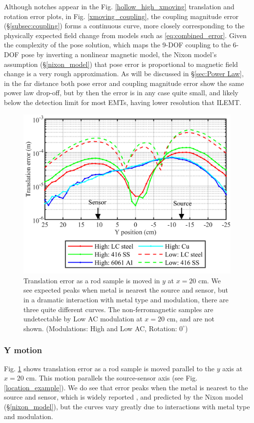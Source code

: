 \documentclass[journal,twoside,web]{ieeecolor}
\begin{document}
Although notches appear in the Fig. \ref{hollow_high_xmoving} translation and rotation error plots, in Fig. \ref{xmoving_coupling}, the coupling magnitude error (\S\ref{subsec:coupling}) forms a continuous curve, more closely corresponding to the physically expected field change from models such as \eqref{eq:combined_error}. Given the complexity of the pose solution, which maps the 9-DOF coupling to the 6-DOF pose by inverting a nonlinear magnetic model, the Nixon model's assumption (\S\ref{nixon_model}) that pose error is proportional to magnetic field change is a very rough approximation. As will be discussed in \S\ref{sec:Power Law}, in the far distance both pose error and coupling magnitude error show the same power law drop-off, but by then the error is in any case quite small, and likely below the detection limit for most EMTs, having lower resolution that ILEMT.


\begin{figure}[!tb]
\centerline{\includegraphics[width=\columnwidth]{chaic8.png}}
\caption{Translation error as a rod sample is moved in $y$ at $x = 20$ cm. We see expected peaks when metal is nearest the source and sensor, but in a dramatic interaction with metal type and modulation, there are three quite different curves. The non-ferromagnetic samples are undetectable by Low AC modulation at $x=20$ cm, and are not shown.
(Modulations: High and Low AC, Rotation: $0^\circ$)}
\label{ymoving_transrot}
\end{figure}

\subsubsection{Y motion}
 Fig. \ref{ymoving_transrot} shows translation error as a rod sample is moved parallel to the $y$ axis at $x = 20$ cm. This motion parallels the source-sensor axis (see Fig. \ref{location_example}). We do see that error peaks when the metal is nearest to the source and sensor, which is widely reported \cite { nixon_effects_1998, milne_accuracy_1996}, and predicted by the Nixon model (\S\ref{nixon_model}), but the curves vary greatly due to interactions with metal type and modulation.
 
\end{document}
